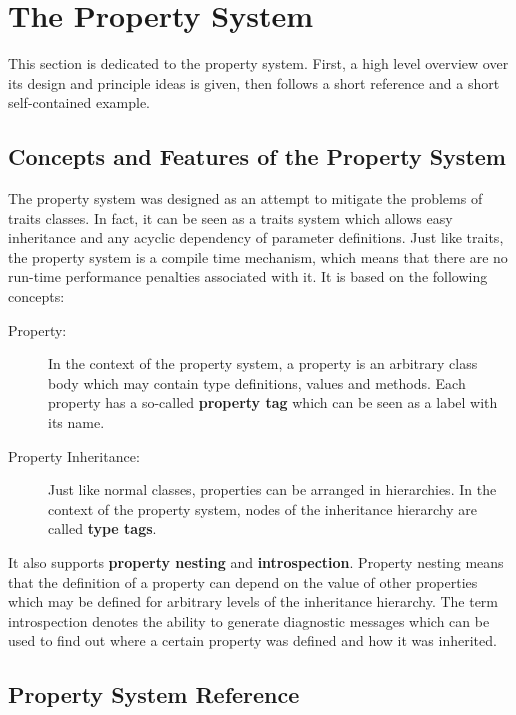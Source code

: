 \chapter{The \Dumux Property System}
\label{sec:propertysystem}

This section is dedicated to the \Dumux property system. First, a high
level overview over its design and principle ideas is given, then
follows a short reference and a short self-contained example.

\section{Concepts and Features of the \Dumux Property System}

The \Dumux property system was designed as an attempt to mitigate the
problems of traits classes. In fact, it can be seen as a traits system
which allows easy inheritance and any acyclic dependency of parameter
definitions. Just like traits, the \Dumux property system is a compile
time mechanism, which means that there are no run-time performance
penalties associated with it. It is based on the following concepts:
\begin{description}
\item[Property:] In the context of the \Dumux property system, a
  property is an arbitrary class body which may contain type
  definitions, values and methods. Each property has a so-called
  \textbf{property tag} which can be seen as a label with its name.
\item[Property Inheritance:] Just like normal classes, properties can
  be arranged in hierarchies. In the context of the \Dumux property
  system, nodes of the inheritance hierarchy are called \textbf{type
    tags}.
\end{description}

It also supports \textbf{property nesting} and
\textbf{introspection}. Property nesting means that the definition of
a property can depend on the value of other properties which may be
defined for arbitrary levels of the inheritance hierarchy.  The term
introspection denotes the ability to generate diagnostic messages
which can be used to find out where a certain property was defined and
how it was inherited.

\section{\Dumux Property System Reference}

